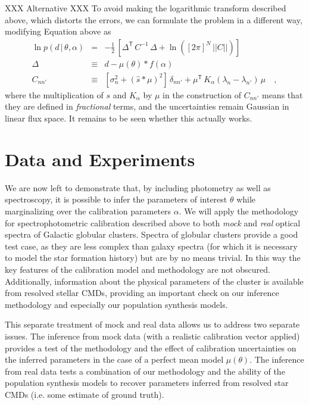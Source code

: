 \documentclass[iop,numberedappendix]{emulateapj}
\newcommand{\transpose}[1]{{#1}^{\!\mathsf T}}
\newcommand{\given}{\,|\,}
\renewcommand{\det}[1]{||{#1}||}
\begin{document}
XXX Alternative XXX
To avoid making the logarithmic transform described above, which
distorts the errors, we can formulate the problem in a different way,
modifying Equation \label{eq:spectroscopicLF} above as 
\begin{eqnarray}\label{eq:spectroscopicLF_v2}
\ln p(d\given\theta,\alpha) &=&
                                -\frac{1}{2}\,\left[\transpose{\Delta}\,C^{-1}\,\Delta
                                + \ln([2\pi]^N\,\det{C}) \right]
\\
\Delta &\equiv& d - \mu(\theta) * f(\alpha) 
\\
C_{nn'} &\equiv& [\sigma_n^2 + (\hat{s} * \mu)^2]\,\delta_{nn'} +
\transpose{\mu} \, K_\alpha(\lambda_n - \lambda_{n'}) \, \mu
\quad ,
\end{eqnarray}
where the multiplication of $s$ and $K_\alpha$ by $\mu$ in the
construction of $C_{nn'}$ means that they are defined in
\emph{fractional} terms, and the uncertainties remain Gaussian in
linear flux space.  It remains to be seen whether this actually works.


\section{Data and Experiments}

We are now left to demonstrate that, by including photometry as well
as spectroscopy, it is possible to infer the parameters of interest
$\theta$ while marginalizing over the calibration parameters $\alpha$.
We will apply the methodology for spectrophotometric calibration
described above to both \emph{mock} and \emph{real} optical spectra of
Galactic globular clusters.  Spectra of globular clusters provide a
good test case, as they are less complex than galaxy spectra (for
which it is necessary to model the star formation history) but are by
no means trivial. In this way the key features of the calibration
model and methodology are not obscured.  Additionally, information
about the physical parameters of the cluster is available from
resolved stellar CMDs, providing an important check on our inference
methodology and especially our population synthesis models.

This separate treatment of mock and real data allows us to address two
separate issues.  The inference from mock data (with a realistic
calibration vector applied) provides a test of the methodology and the
effect of calibration uncertainties on the inferred parameters in the
case of a perfect mean model $\mu(\theta)$.  The inference from real
data tests a combination of our methodology and the ability of the
population synthesis models to recover parameters inferred from
resolved star CMDs (i.e. some estimate of ground truth).
\end{document}
